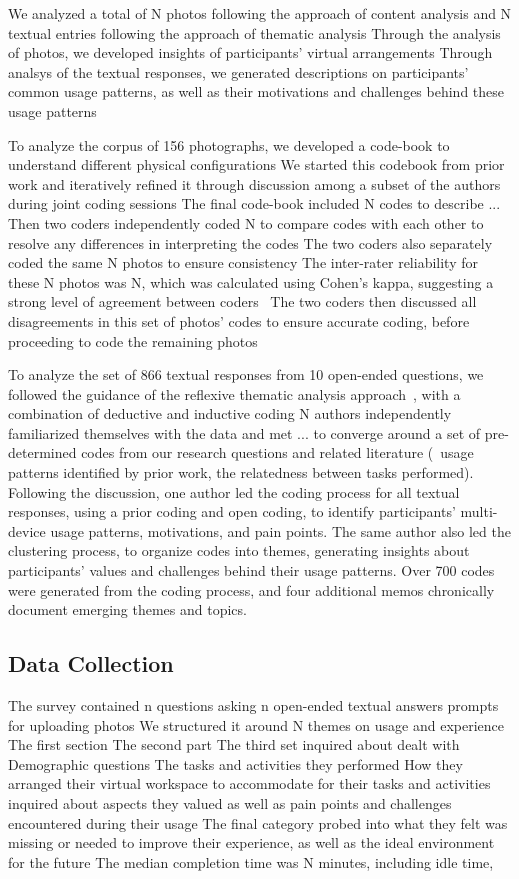 We analyzed a total of N photos following the approach of content analysis
and N textual entries following the approach of thematic analysis 
Through the analysis of photos, we developed insights of participants' virtual arrangements
Through analsys of the textual responses,
we generated descriptions on participants' common usage patterns, as well as their motivations and challenges behind these usage patterns 

To analyze the corpus of 156 photographs, 
we developed a code-book to understand different physical configurations 
We started this codebook from prior work and iteratively refined it through discussion among a subset of the authors during joint coding sessions 
The final code-book included N codes to describe ...
Then two coders independently coded N to compare codes with each other to resolve any differences in interpreting the codes
The two coders also separately coded the same N photos to ensure consistency 
The inter-rater reliability for these N photos was N, which was calculated using Cohen's kappa, suggesting a strong level of agreement between coders~\cite{} %
The two coders then discussed all disagreements in this set of photos' codes to ensure accurate coding, before proceeding to code the remaining photos 

To analyze the set of 866 textual responses from 10 open-ended questions, 
we followed the guidance of the reflexive thematic analysis approach~\cite{}, %
with a combination of deductive and inductive coding
N authors independently familiarized themselves with the data and met ... 
to converge around a set of pre-determined codes from our research questions and related literature (\eg~usage patterns identified by prior work, the relatedness between tasks performed).
Following the discussion, one author led the coding process for all textual responses, using a prior coding and open coding, to identify participants' multi-device usage patterns, motivations, and pain points. 
The same author also led the clustering process, to
organize codes into themes, generating insights about participants’
values and challenges behind their usage patterns. Over 700 codes
were generated from the coding process, and four additional memos
chronically document emerging themes and topics.


\subsection{Data Collection}
The survey contained n questions 
asking n open-ended textual answers 
prompts for uploading photos 
We structured it around N themes on usage and experience 
The first section 
The second part 
The third set
inquired about 
dealt with
Demographic questions 
The tasks and activities they performed 
How they arranged their virtual workspace to accommodate for their tasks and activities
inquired about aspects they valued as well as pain points and challenges encountered during their usage
The final category probed into what they felt was missing or needed to improve their experience,
as well as the ideal environment for the future
The median completion time was N minutes, 
including idle time, 






